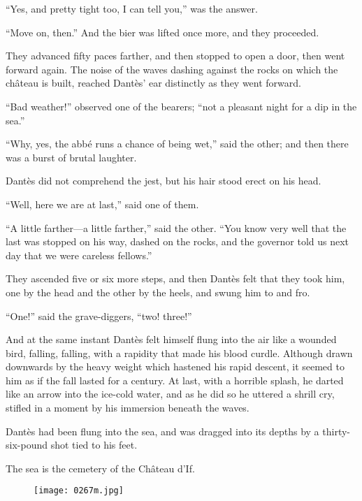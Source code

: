 “Yes, and pretty tight too, I can tell you,” was the answer.

“Move on, then.” And the bier was lifted once more, and they proceeded.

They advanced fifty paces farther, and then stopped to open a door,
then went forward again. The noise of the waves dashing against the
rocks on which the château is built, reached Dantès’ ear distinctly as
they went forward.

“Bad weather!” observed one of the bearers; “not a pleasant night for a
dip in the sea.”

“Why, yes, the abbé runs a chance of being wet,” said the other; and
then there was a burst of brutal laughter.

Dantès did not comprehend the jest, but his hair stood erect on his
head.

“Well, here we are at last,” said one of them.

“A little farther—a little farther,” said the other. “You know very
well that the last was stopped on his way, dashed on the rocks, and the
governor told us next day that we were careless fellows.”

They ascended five or six more steps, and then Dantès felt that they
took him, one by the head and the other by the heels, and swung him to
and fro.

“One!” said the grave-diggers, “two! three!”

And at the same instant Dantès felt himself flung into the air like a
wounded bird, falling, falling, with a rapidity that made his blood
curdle. Although drawn downwards by the heavy weight which hastened his
rapid descent, it seemed to him as if the fall lasted for a century. At
last, with a horrible splash, he darted like an arrow into the ice-cold
water, and as he did so he uttered a shrill cry, stifled in a moment by
his immersion beneath the waves.

Dantès had been flung into the sea, and was dragged into its depths by
a thirty-six-pound shot tied to his feet.

The sea is the cemetery of the Château d’If.

\begin{figure}[h]
\texttt{[image: 0267m.jpg]}
\end{figure}
